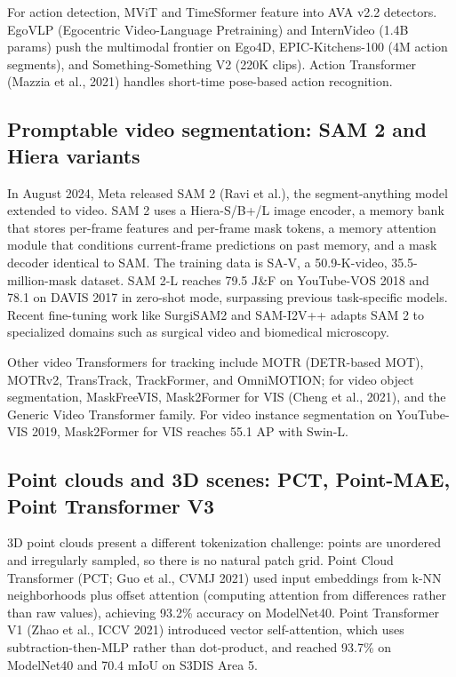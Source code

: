 For action detection, MViT and TimeSformer feature into AVA v2.2 detectors. EgoVLP (Egocentric Video-Language Pretraining) and InternVideo (1.4B params) push the multimodal frontier on Ego4D, EPIC-Kitchens-100 (4M action segments), and Something-Something V2 (220K clips). Action Transformer (Mazzia et al., 2021) handles short-time pose-based action recognition.

\subsection{Promptable video segmentation: SAM 2 and Hiera variants}\label{promptable-video-segmentation-sam-2-and-hiera-variants}

In August 2024, Meta released SAM 2 (Ravi et al.), the segment-anything model extended to video. SAM 2 uses a Hiera-S/B+/L image encoder, a memory bank that stores per-frame features and per-frame mask tokens, a memory attention module that conditions current-frame predictions on past memory, and a mask decoder identical to SAM. The training data is SA-V, a 50.9-K-video, 35.5-million-mask dataset. SAM 2-L reaches 79.5 J\&F on YouTube-VOS 2018 and 78.1 on DAVIS 2017 in zero-shot mode, surpassing previous task-specific models. Recent fine-tuning work like SurgiSAM2 and SAM-I2V++ adapts SAM 2 to specialized domains such as surgical video and biomedical microscopy.

Other video Transformers for tracking include MOTR (DETR-based MOT), MOTRv2, TransTrack, TrackFormer, and OmniMOTION; for video object segmentation, MaskFreeVIS, Mask2Former for VIS (Cheng et al., 2021), and the Generic Video Transformer family. For video instance segmentation on YouTube-VIS 2019, Mask2Former for VIS reaches 55.1 AP with Swin-L.

\subsection{Point clouds and 3D scenes: PCT, Point-MAE, Point Transformer V3}\label{point-clouds-and-3d-scenes-pct-point-mae-point-transformer-v3}

3D point clouds present a different tokenization challenge: points are unordered and irregularly sampled, so there is no natural patch grid. Point Cloud Transformer (PCT; Guo et al., CVMJ 2021) used input embeddings from k-NN neighborhoods plus offset attention (computing attention from differences rather than raw values), achieving 93.2\% accuracy on ModelNet40. Point Transformer V1 (Zhao et al., ICCV 2021) introduced vector self-attention, which uses subtraction-then-MLP rather than dot-product, and reached 93.7\% on ModelNet40 and 70.4 mIoU on S3DIS Area 5.

